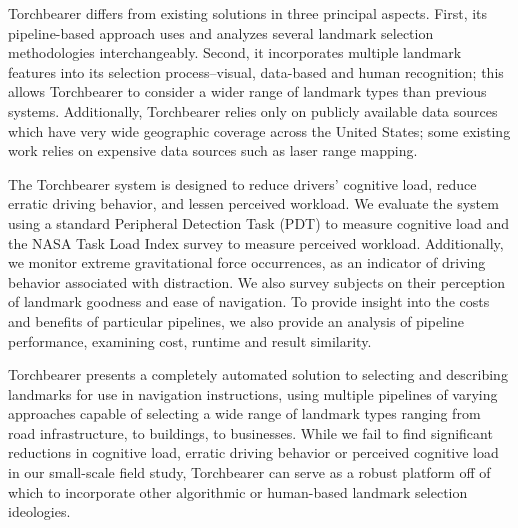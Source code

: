 Torchbearer differs from existing solutions in three principal aspects. First, its pipeline-based approach uses and analyzes several landmark selection methodologies interchangeably. Second, it incorporates multiple landmark features into its selection process--visual, data-based and human recognition; this allows Torchbearer to consider a wider range of landmark types than previous systems. Additionally, Torchbearer relies only on publicly available data sources which have very wide geographic coverage across the United States; some existing work relies on expensive data sources such as laser range mapping.

The Torchbearer system is designed to reduce drivers' cognitive load, reduce erratic driving behavior, and lessen perceived workload. We evaluate the system using a standard Peripheral Detection Task (PDT) to measure cognitive load and the NASA Task Load Index survey to measure perceived workload. Additionally, we monitor extreme gravitational force occurrences, as an indicator of driving behavior associated with distraction. We also survey subjects on their perception of landmark goodness and ease of navigation. To provide insight into the costs and benefits of particular pipelines, we also provide an analysis of pipeline performance, examining cost, runtime and result similarity. 

Torchbearer presents a completely automated solution to selecting and describing landmarks for use in navigation instructions, using multiple pipelines of varying approaches capable of selecting a wide range of landmark types ranging from road infrastructure, to buildings, to businesses. While we fail to find significant reductions in cognitive load, erratic driving behavior or perceived cognitive load in our small-scale field study, Torchbearer can serve as a robust platform off of which to incorporate other algorithmic or human-based landmark selection ideologies.